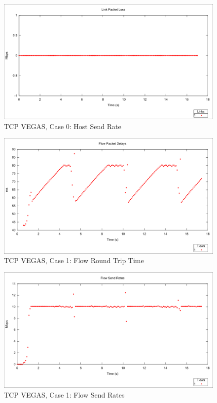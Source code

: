 \begin{figure}[htbp]
    \centering
    \includegraphics[width=\textwidth]{vegas0/Link_Packet_Loss.png}
    \caption{TCP VEGAS, Case 0: Host Send Rate}
\end{figure}

\newpage
\clearpage


\begin{figure}[htbp]
    \centering
    \includegraphics[width=\textwidth]{vegas1/Flow_RTT.png}
    \caption{TCP VEGAS, Case 1: Flow Round Trip Time}
\end{figure}

\begin{figure}[htbp]
    \centering
    \includegraphics[width=\textwidth]{vegas1/Flow_Send_Rates.png}
    \caption{TCP VEGAS, Case 1: Flow Send Rates}
\end{figure}

